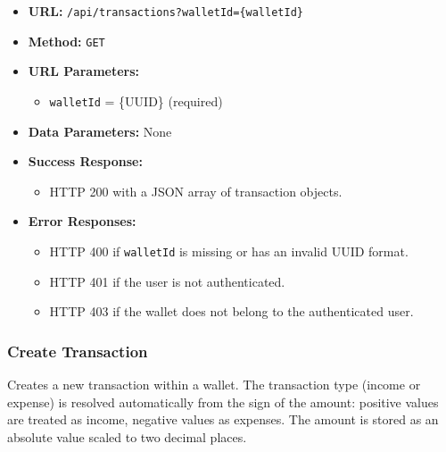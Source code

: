 \begin{itemize}
    \item \textbf{URL:} \texttt{/api/transactions?walletId=\{walletId\}}
    \item \textbf{Method:} \texttt{GET}
    \item \textbf{URL Parameters:}
    \begin{itemize}
        \item \texttt{walletId} = \{UUID\} (required)
    \end{itemize}
    \item \textbf{Data Parameters:} None
    \item \textbf{Success Response:}
    \begin{itemize}
        \item HTTP 200 with a JSON array of transaction objects.
    \end{itemize}
    \item \textbf{Error Responses:}
    \begin{itemize}
        \item HTTP 400 if \texttt{walletId} is missing or has an invalid UUID format.
        \item HTTP 401 if the user is not authenticated.
        \item HTTP 403 if the wallet does not belong to the authenticated user.
    \end{itemize}
\end{itemize}

\subsubsection{Create Transaction}

Creates a new transaction within a wallet. The transaction type (income or expense) is resolved automatically from the sign of the amount: positive values are treated as income, negative values as expenses. The amount is stored as an absolute value scaled to two decimal places.


